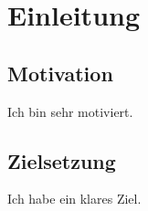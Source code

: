 \chapter{Einleitung}
\label{cha:Blabla}
\section{Motivation}
Ich bin sehr motiviert.
\section{Zielsetzung}
Ich habe ein klares Ziel.